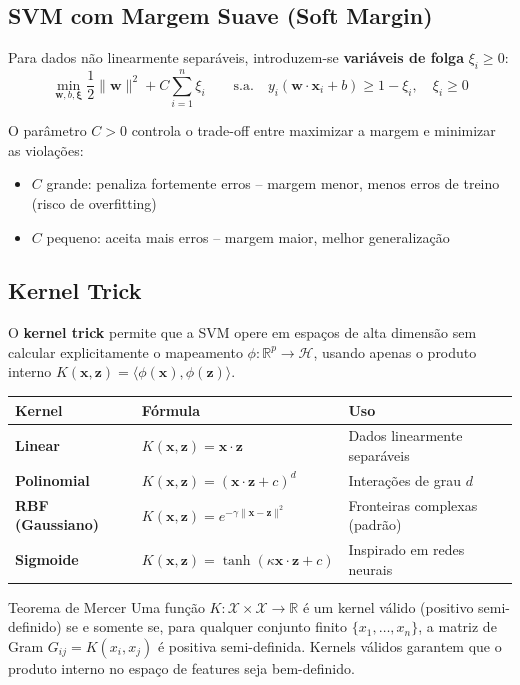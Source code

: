 \documentclass[12pt,a4paper]{article}
\begin{document}
\subsection{SVM com Margem Suave (Soft Margin)}

Para dados não linearmente separáveis, introduzem-se \textbf{variáveis de folga} $\xi_i \geq 0$:
\[
  \min_{\mathbf{w},b,\boldsymbol{\xi}} \frac{1}{2}\|\mathbf{w}\|^2 + C\sum_{i=1}^n \xi_i
  \qquad \text{s.a.} \quad y_i(\mathbf{w} \cdot \mathbf{x}_i + b) \geq 1 - \xi_i, \quad \xi_i \geq 0
\]

O parâmetro $C > 0$ controla o trade-off entre maximizar a margem e minimizar as violações:
\begin{itemize}
  \item $C$ grande: penaliza fortemente erros -- margem menor, menos erros de treino (risco de overfitting)
  \item $C$ pequeno: aceita mais erros -- margem maior, melhor generalização
\end{itemize}

\subsection{Kernel Trick}

O \textbf{kernel trick} permite que a SVM opere em espaços de alta dimensão sem calcular explicitamente o mapeamento $\phi: \mathbb{R}^p \rightarrow \mathcal{H}$, usando apenas o produto interno $K(\mathbf{x}, \mathbf{z}) = \langle\phi(\mathbf{x}), \phi(\mathbf{z})\rangle$.

\begin{tabular}{>{\bfseries}p{3cm}p{5cm}p{4.5cm}}
\toprule
Kernel & Fórmula & Uso \\
\midrule
Linear & $K(\mathbf{x},\mathbf{z}) = \mathbf{x} \cdot \mathbf{z}$ & Dados linearmente separáveis \\
Polinomial & $K(\mathbf{x},\mathbf{z}) = (\mathbf{x} \cdot \mathbf{z} + c)^d$ & Interações de grau $d$ \\
RBF (Gaussiano) & $K(\mathbf{x},\mathbf{z}) = e^{-\gamma\|\mathbf{x}-\mathbf{z}\|^2}$ & Fronteiras complexas (padrão) \\
Sigmoide & $K(\mathbf{x},\mathbf{z}) = \tanh(\kappa\mathbf{x}\cdot\mathbf{z} + c)$ & Inspirado em redes neurais \\
\bottomrule
\end{tabular}

\vspace{0.5em}
\begin{definicaobox}{Teorema de Mercer}
Uma função $K: \mathcal{X} \times \mathcal{X} \rightarrow \mathbb{R}$ é um kernel válido (positivo semi-definido) se e somente se, para qualquer conjunto finito $\{x_1,\ldots,x_n\}$, a matriz de Gram $G_{ij} = K(x_i, x_j)$ é positiva semi-definida. Kernels válidos garantem que o produto interno no espaço de features seja bem-definido.
\end{definicaobox}
\end{document}
